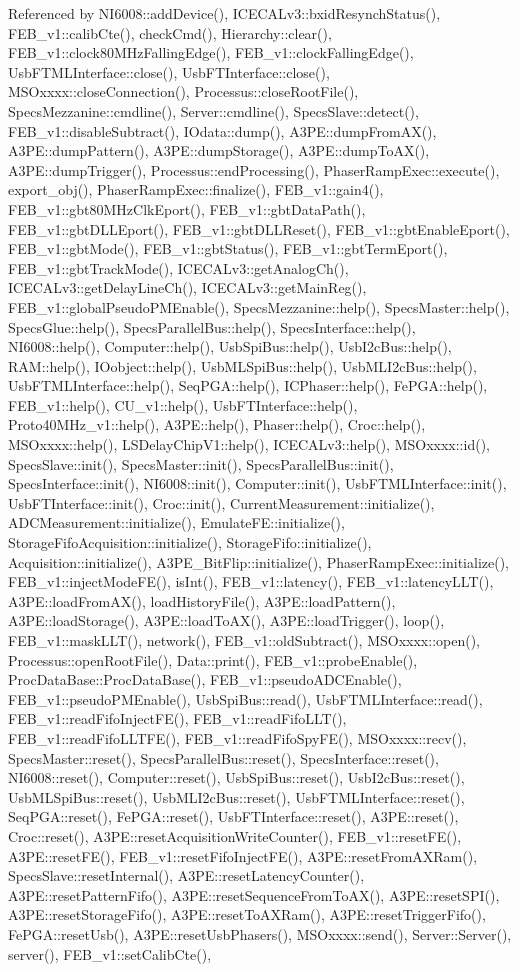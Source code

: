 Referenced by NI6008::addDevice(), ICECALv3::bxidResynchStatus(), FEB\_\-v1::calibCte(), checkCmd(), Hierarchy::clear(), FEB\_\-v1::clock80MHzFallingEdge(), FEB\_\-v1::clockFallingEdge(), UsbFTMLInterface::close(), UsbFTInterface::close(), MSOxxxx::closeConnection(), Processus::closeRootFile(), SpecsMezzanine::cmdline(), Server::cmdline(), SpecsSlave::detect(), FEB\_\-v1::disableSubtract(), IOdata::dump(), A3PE::dumpFromAX(), A3PE::dumpPattern(), A3PE::dumpStorage(), A3PE::dumpToAX(), A3PE::dumpTrigger(), Processus::endProcessing(), PhaserRampExec::execute(), export\_\-obj(), PhaserRampExec::finalize(), FEB\_\-v1::gain4(), FEB\_\-v1::gbt80MHzClkEport(), FEB\_\-v1::gbtDataPath(), FEB\_\-v1::gbtDLLEport(), FEB\_\-v1::gbtDLLReset(), FEB\_\-v1::gbtEnableEport(), FEB\_\-v1::gbtMode(), FEB\_\-v1::gbtStatus(), FEB\_\-v1::gbtTermEport(), FEB\_\-v1::gbtTrackMode(), ICECALv3::getAnalogCh(), ICECALv3::getDelayLineCh(), ICECALv3::getMainReg(), FEB\_\-v1::globalPseudoPMEnable(), SpecsMezzanine::help(), SpecsMaster::help(), SpecsGlue::help(), SpecsParallelBus::help(), SpecsInterface::help(), NI6008::help(), Computer::help(), UsbSpiBus::help(), UsbI2cBus::help(), RAM::help(), IOobject::help(), UsbMLSpiBus::help(), UsbMLI2cBus::help(), UsbFTMLInterface::help(), SeqPGA::help(), ICPhaser::help(), FePGA::help(), FEB\_\-v1::help(), CU\_\-v1::help(), UsbFTInterface::help(), Proto40MHz\_\-v1::help(), A3PE::help(), Phaser::help(), Croc::help(), MSOxxxx::help(), LSDelayChipV1::help(), ICECALv3::help(), MSOxxxx::id(), SpecsSlave::init(), SpecsMaster::init(), SpecsParallelBus::init(), SpecsInterface::init(), NI6008::init(), Computer::init(), UsbFTMLInterface::init(), UsbFTInterface::init(), Croc::init(), CurrentMeasurement::initialize(), ADCMeasurement::initialize(), EmulateFE::initialize(), StorageFifoAcquisition::initialize(), StorageFifo::initialize(), Acquisition::initialize(), A3PE\_\-BitFlip::initialize(), PhaserRampExec::initialize(), FEB\_\-v1::injectModeFE(), isInt(), FEB\_\-v1::latency(), FEB\_\-v1::latencyLLT(), A3PE::loadFromAX(), loadHistoryFile(), A3PE::loadPattern(), A3PE::loadStorage(), A3PE::loadToAX(), A3PE::loadTrigger(), loop(), FEB\_\-v1::maskLLT(), network(), FEB\_\-v1::oldSubtract(), MSOxxxx::open(), Processus::openRootFile(), Data::print(), FEB\_\-v1::probeEnable(), ProcDataBase::ProcDataBase(), FEB\_\-v1::pseudoADCEnable(), FEB\_\-v1::pseudoPMEnable(), UsbSpiBus::read(), UsbFTMLInterface::read(), FEB\_\-v1::readFifoInjectFE(), FEB\_\-v1::readFifoLLT(), FEB\_\-v1::readFifoLLTFE(), FEB\_\-v1::readFifoSpyFE(), MSOxxxx::recv(), SpecsMaster::reset(), SpecsParallelBus::reset(), SpecsInterface::reset(), NI6008::reset(), Computer::reset(), UsbSpiBus::reset(), UsbI2cBus::reset(), UsbMLSpiBus::reset(), UsbMLI2cBus::reset(), UsbFTMLInterface::reset(), SeqPGA::reset(), FePGA::reset(), UsbFTInterface::reset(), A3PE::reset(), Croc::reset(), A3PE::resetAcquisitionWriteCounter(), FEB\_\-v1::resetFE(), A3PE::resetFE(), FEB\_\-v1::resetFifoInjectFE(), A3PE::resetFromAXRam(), SpecsSlave::resetInternal(), A3PE::resetLatencyCounter(), A3PE::resetPatternFifo(), A3PE::resetSequenceFromToAX(), A3PE::resetSPI(), A3PE::resetStorageFifo(), A3PE::resetToAXRam(), A3PE::resetTriggerFifo(), FePGA::resetUsb(), A3PE::resetUsbPhasers(), MSOxxxx::send(), Server::Server(), server(), FEB\_\-v1::setCalibCte(), 